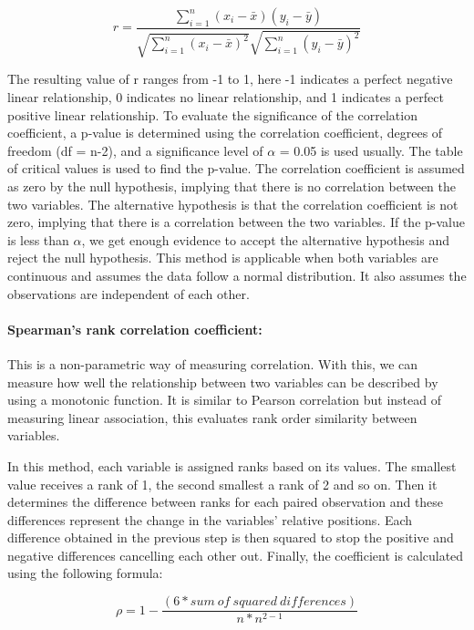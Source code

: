 \documentclass[a4paper,fleqn]{cas-sc}
\begin{document}
\begin{equation}
    r = \frac{\sum\limits_{i=1}^{n} (x_i - \bar{x})(y_i - \bar{y})}{\sqrt{\sum\limits_{i=1}^{n} (x_i - \bar{x})^2}\sqrt{\sum\limits_{i=1}^{n} (y_i - \bar{y})^2}}
\end{equation}

The resulting value of r ranges from -1 to 1, here -1 indicates a perfect negative linear relationship, 0 indicates no linear relationship, and 1 indicates a perfect positive linear relationship. To evaluate the significance of the correlation coefficient, a p-value is determined using the correlation coefficient, degrees of freedom (df = n-2), and a significance level of $\alpha$ = 0.05 is used usually. The table of critical values is used to find the p-value. The correlation coefficient is assumed as zero by the null hypothesis, implying that there is no correlation between the two variables. The alternative hypothesis is that the correlation coefficient is not zero, implying that there is a correlation between the two variables. If the p-value is less than $\alpha$, we get enough evidence to accept the alternative hypothesis and reject the null hypothesis. This method is applicable when both variables are continuous and assumes the data follow a normal distribution. It also assumes the observations are independent of each other. 

\paragraph{Spearman's rank correlation coefficient:}
This is a non-parametric way of measuring correlation. With this, we can measure how well the relationship between two variables can be described by using a monotonic function. It is similar to Pearson correlation but instead of measuring linear association, this evaluates rank order similarity between variables. 

In this method, each variable is assigned ranks based on its values. The smallest value receives a rank of 1, the second smallest a rank of 2 and so on. Then it determines the difference between ranks for each paired observation and these differences represent the change in the variables' relative positions. Each difference obtained in the previous step is then squared to stop the positive and negative differences cancelling each other out. Finally, the coefficient is calculated using the following formula:

\begin{equation}
    \rho = 1 - \frac{(6 * sum\ of\ squared\ differences)}{n * n^{2-1}}
\end{equation}
\end{document}
